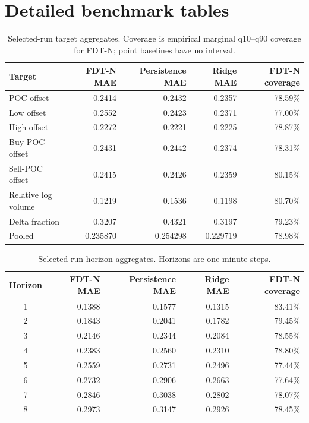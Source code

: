 \documentclass[10pt]{article}
\begin{document}
\section{Detailed benchmark tables}

\begin{table}[H]
\centering
\small
\caption{Selected-run target aggregates. Coverage is empirical marginal q10--q90 coverage for
FDT-N; point baselines have no interval.}
\label{tab:target-results}
\begin{tabular}{@{}lrrrr@{}}
\toprule
Target & FDT-N MAE & Persistence MAE & Ridge MAE & FDT-N coverage \\
\midrule
POC offset & 0.2414 & 0.2432 & 0.2357 & 78.59\% \\
Low offset & 0.2552 & 0.2423 & 0.2371 & 77.00\% \\
High offset & 0.2272 & 0.2221 & 0.2225 & 78.87\% \\
Buy-POC offset & 0.2431 & 0.2442 & 0.2374 & 78.31\% \\
Sell-POC offset & 0.2415 & 0.2426 & 0.2359 & 80.15\% \\
Relative log volume & 0.1219 & 0.1536 & 0.1198 & 80.70\% \\
Delta fraction & 0.3207 & 0.4321 & 0.3197 & 79.23\% \\
\midrule
Pooled & 0.235870 & 0.254298 & 0.229719 & 78.98\% \\
\bottomrule
\end{tabular}
\end{table}

\begin{table}[H]
\centering
\small
\caption{Selected-run horizon aggregates. Horizons are one-minute steps.}
\label{tab:horizon-results}
\begin{tabular}{@{}crrrr@{}}
\toprule
Horizon & FDT-N MAE & Persistence MAE & Ridge MAE & FDT-N coverage \\
\midrule
1 & 0.1388 & 0.1577 & 0.1315 & 83.41\% \\
2 & 0.1843 & 0.2041 & 0.1782 & 79.45\% \\
3 & 0.2146 & 0.2344 & 0.2084 & 78.55\% \\
4 & 0.2383 & 0.2560 & 0.2310 & 78.80\% \\
5 & 0.2559 & 0.2731 & 0.2496 & 77.44\% \\
6 & 0.2732 & 0.2906 & 0.2663 & 77.64\% \\
7 & 0.2846 & 0.3038 & 0.2802 & 78.07\% \\
8 & 0.2973 & 0.3147 & 0.2926 & 78.45\% \\
\bottomrule
\end{tabular}
\end{table}
\end{document}

